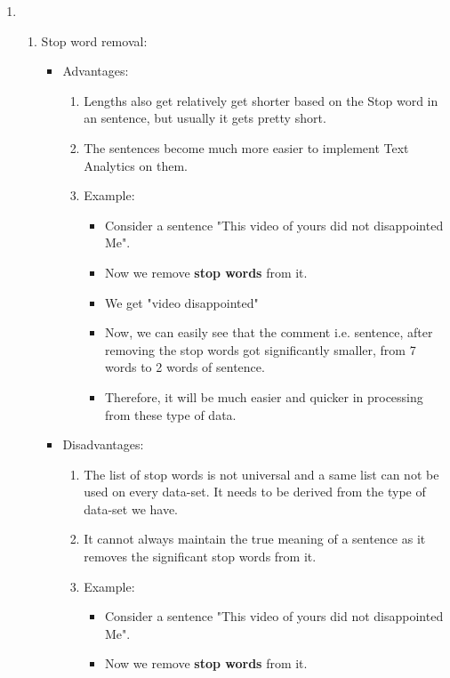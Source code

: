 \documentclass{article}
\begin{document}
{\begin{enumerate}
\begin{enumerate}
    \end{enumerate}
    \item \begin{enumerate}
        \item Stop word removal:
        \begin{itemize}
            \item Advantages:
            \begin{enumerate}
                \item Lengths also get relatively get shorter based on the Stop word in an sentence, but usually it gets pretty short.
                \item The sentences become much more easier to implement Text Analytics on them.
                \item Example: 
                \begin{itemize}
                    \item Consider a sentence "This video of yours did not disappointed Me".
                    \item Now we remove \textbf{stop words} from it.
                    \item We get "video disappointed"
                    \item Now, we can easily see that the comment i.e. sentence, after removing the stop words got significantly smaller, from 7 words to 2 words of sentence.
                    \item Therefore, it will be much easier and quicker in processing from these type of data.
                \end{itemize}
            \end{enumerate}
            \item Disadvantages:
            \begin{enumerate}
                \item The list of stop words is not universal and a same list can not be used on every data-set. It needs to be derived from the type of data-set we have.
                \item It cannot always maintain the true meaning of a sentence as it removes the significant stop words from it.
                \item Example: 
                \begin{itemize}
                    \item Consider a sentence "This video of yours did not disappointed Me".
                    \item Now we remove \textbf{stop words} from it.

\end{itemize}
\end{enumerate}
\end{itemize}
\end{enumerate}
\end{enumerate}}
\end{document}
